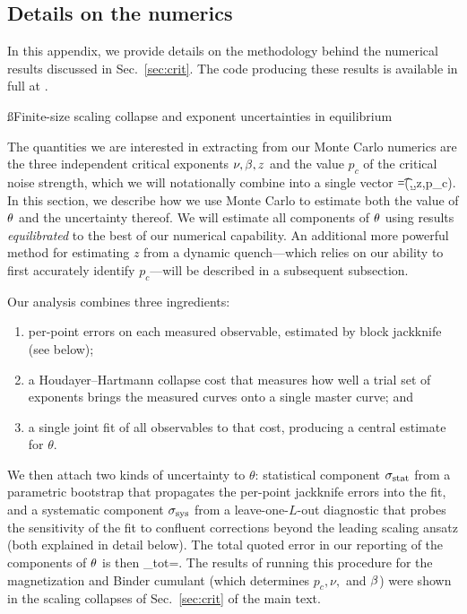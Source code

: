 \documentclass[pra,aps,twocolumn,groupedaddress,superscriptaddress,nofootinbib,preprintnumbers]{revtex4-2}
\begin{document}
\begin{widetext}
		\section{Details on the numerics}\label{app:numerics}
		
		In this appendix, we provide details on the methodology behind the numerical results discussed in Sec.~\ref{sec:crit}. The code producing these results is available in full at \cite{code}. 
		
		
		\ss{Finite-size scaling collapse and exponent uncertainties in equilibrium} \label{ss:collapse}

		
		The quantities we are interested in extracting from our Monte Carlo numerics are the three independent critical exponents $\nu,\beta,z$ and the value $p_c$ of the critical noise strength, which we will notationally combine into a single vector 
		\be \t =(\nu,\b,z,p_c).\ee 
		In this section, we describe how we use Monte Carlo to estimate both the value of $\theta$ and the uncertainty thereof. We will estimate all components of $\theta$ using results {\it equilibrated} to the best of our numerical capability. An additional more powerful method for estimating $z$ from a dynamic quench---which relies on our ability to first accurately identify $p_c$---will be described in a subsequent subsection. 
		
		Our analysis combines three ingredients: 
		\begin{enumerate} 
			\item per-point
			errors on each measured observable, estimated by block jackknife (see below); 
			\item a Houdayer--Hartmann \cite{houdayer2004low} collapse cost that measures how well a trial set
			of exponents brings the measured curves onto a single master curve; and 
			\item a single joint fit of all observables to that cost,
			producing a central estimate for $\theta$. 
		\end{enumerate} 
		We then attach two kinds of uncertainty to $\theta$: statistical component $\sigma_{\rm stat}$ from a parametric
		bootstrap that propagates the per-point jackknife errors into the
		fit, and a systematic component $\sigma_{\rm sys}$ from a
		leave-one-$L$-out diagnostic that probes the sensitivity of the fit
		to confluent corrections beyond the leading scaling ansatz (both explained in detail below). The total
		quoted error in our reporting of the components of $\theta$ is then 
		\be \label{sigmatot} \sigma_{\rm tot}=.\ee 		
		The results of running this procedure for the magnetization and Binder cumulant (which determines $p_c,\nu,$ and $\beta$) were shown in the scaling collapses of Sec.~\ref{sec:crit} of the main text. 
		

\end{widetext}
\end{document}
